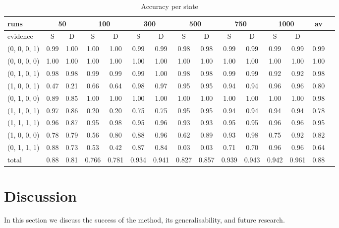 \documentclass[12pt]{article}
\begin{document}
\begin{table}[htbp]
\footnotesize
\centering
\begin{tabular}{|l|c|c|c|c|c|c|c|c|c|c|c|c|c|c|}
\hline
	runs				&	\multicolumn{2}{|c|}{50}  &	\multicolumn{2}{|c|}{100}	&	\multicolumn{2}{|c|}{300} &	\multicolumn{2}{|c|}{500}	&	\multicolumn{2}{|c|}{750}&	\multicolumn{2}{|c|}{1000}	 & 	av	\\
\hline
	evidence						&	S	&	D	&	S	&	D	&	S	&	D	&	S	&	D	&	S	&	D	&	S	&	D	&		\\
\hline
(0, 	0, 	0, 	1) 				& 	0.99 & 1.00&	1.00 & 1.00	&	0.99 & 0.99	& 	0.98 & 0.98	& 	0.99 & 0.99	& 	0.99 & 0.99 & 0.99	\\
(0, 	0, 	0, 	0) 				& 	1.00 & 1.00&	1.00 & 1.00	&	1.00 & 1.00	& 	1.00 & 1.00	& 	1.00 & 1.00	& 	1.00 & 1.00& 1.00	\\
(0, 	1, 	0, 	1) 				& 	0.98 & 0.98&	0.99 & 0.99	&	0.99 & 1.00	& 	0.98 & 0.98	& 	0.99 & 0.99	& 	0.92 & 0.92& 0.98	\\
(1, 	0, 	0, 	1) 				& 	0.47 & 0.21&	0.66 & 0.64	&	0.98 & 0.97	& 	0.95 & 0.95	& 	0.94 & 0.94	& 	0.96 & 0.96& 0.80	\\
(0, 	1, 	0, 	0) 				& 	0.89 & 0.85&	1.00 & 1.00	&	1.00 & 1.00	& 	1.00 & 1.00	& 	1.00 & 1.00	& 	1.00 & 1.00& 0.98	\\
(1, 	1, 	0, 	1) 				& 	0.97 & 0.86&	0.20 & 0.20	&	0.75 & 0.75	& 	0.95 & 0.95	& 	0.94 & 0.94	& 	0.94 & 0.94& 0.78	\\
(1, 	1, 	1, 	1) 				& 	0.96 & 0.87&	0.95 & 0.98	&	0.95 & 0.96	& 	0.93 & 0.93	& 	0.95 & 0.95	& 	0.96 & 0.96& 0.95	\\
(1, 	0, 	0, 	0) 				& 	0.78 & 0.79&	0.56 & 0.80	&	0.88 & 0.96	& 	0.62 & 0.89	& 	0.93 & 0.98	& 	0.75 & 0.92& 0.82	\\
(0, 	1, 	1, 	1) 				& 	0.88 & 0.73&	0.53 & 0.42	&	0.87 & 0.84	& 	0.03 & 0.03	& 	0.71 & 0.70	& 	0.96 & 0.96& 0.64	\\
\hline
total    						& 	0.88 &  0.81 & 0.766 &  0.781 &    0.934 &  0.941   &     0.827 &  0.857 &    0.939 &  0.943 &     0.942 &  0.961   & 0.88 \\
\hline
\end{tabular}
\caption{Accuracy per state}
\label{eye}
\end{table}


\newpage



\section{Discussion}
In this section we discuss the success of the method, its generalisability, and future research.
\end{document}
